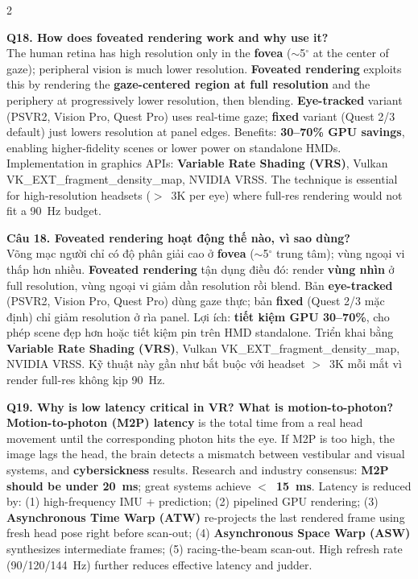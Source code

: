 \begin{paracol}{2}
\switchcolumn*

\textbf{Q18. How does foveated rendering work and why use it?}\\
The human retina has high resolution only in the \textbf{fovea} ($\sim$5$^\circ$ at the center of gaze); peripheral vision is much lower resolution. \textbf{Foveated rendering} exploits this by rendering the \textbf{gaze-centered region at full resolution} and the periphery at progressively lower resolution, then blending. \textbf{Eye-tracked} variant (PSVR2, Vision Pro, Quest Pro) uses real-time gaze; \textbf{fixed} variant (Quest 2/3 default) just lowers resolution at panel edges. Benefits: \textbf{30--70\% GPU savings}, enabling higher-fidelity scenes or lower power on standalone HMDs. Implementation in graphics APIs: \textbf{Variable Rate Shading (VRS)}, Vulkan VK\_EXT\_fragment\_density\_map, NVIDIA VRSS. The technique is essential for high-resolution headsets ($>$~3K per eye) where full-res rendering would not fit a 90~Hz budget.

\switchcolumn

\textbf{Câu 18. Foveated rendering hoạt động thế nào, vì sao dùng?}\\
Võng mạc người chỉ có độ phân giải cao ở \textbf{fovea} ($\sim$5$^\circ$ trung tâm); vùng ngoại vi thấp hơn nhiều. \textbf{Foveated rendering} tận dụng điều đó: render \textbf{vùng nhìn} ở full resolution, vùng ngoại vi giảm dần resolution rồi blend. Bản \textbf{eye-tracked} (PSVR2, Vision Pro, Quest Pro) dùng gaze thực; bản \textbf{fixed} (Quest 2/3 mặc định) chỉ giảm resolution ở rìa panel. Lợi ích: \textbf{tiết kiệm GPU 30--70\%}, cho phép scene đẹp hơn hoặc tiết kiệm pin trên HMD standalone. Triển khai bằng \textbf{Variable Rate Shading (VRS)}, Vulkan VK\_EXT\_fragment\_density\_map, NVIDIA VRSS. Kỹ thuật này gần như bắt buộc với headset $>$~3K mỗi mắt vì render full-res không kịp 90~Hz.

\switchcolumn*

\textbf{Q19. Why is low latency critical in VR? What is motion-to-photon?}\\
\textbf{Motion-to-photon (M2P) latency} is the total time from a real head movement until the corresponding photon hits the eye. If M2P is too high, the image lags the head, the brain detects a mismatch between vestibular and visual systems, and \textbf{cybersickness} results. Research and industry consensus: \textbf{M2P should be under 20~ms}; great systems achieve \textbf{$<$~15~ms}. Latency is reduced by: (1) high-frequency IMU + prediction; (2) pipelined GPU rendering; (3) \textbf{Asynchronous Time Warp (ATW)} re-projects the last rendered frame using fresh head pose right before scan-out; (4) \textbf{Asynchronous Space Warp (ASW)} synthesizes intermediate frames; (5) racing-the-beam scan-out. High refresh rate (90/120/144~Hz) further reduces effective latency and judder.


\end{paracol}
